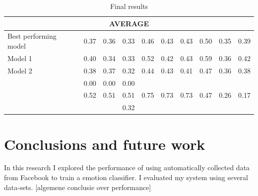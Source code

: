 \documentclass[
10pt, %
a4paper, %
oneside, %
headinclude,footinclude, %
BCOR5mm, %
]{scrartcl}
\begin{document}
\begin{table}[!htbp]
\begin{tabular}{|l|l|l|l|l|l|l|l|l|l|}
\hline
    \multicolumn{10}{|c|}{{AVERAGE}} \\                               
    
\hline
  \tiny{Best performing model} & 
  \footnotesize{0.37} & 
  \footnotesize{0.36} & 
  \footnotesize{0.33} & 
  \footnotesize{0.46} & 
  \footnotesize{0.43} & 
  \footnotesize{0.43} & 
  \footnotesize{0.50} & 
  \footnotesize{0.35} & 
  \footnotesize{0.39} \\ 

\hline
    \tiny{Model 1} & 
    \footnotesize{0.40} & 
    \footnotesize{0.34} & 
    \footnotesize{0.33} & 
    \footnotesize{0.52} & 
    \footnotesize{0.42} & 
    \footnotesize{0.43} & 
    \footnotesize{0.59} & 
    \footnotesize{0.36} & 
    \footnotesize{0.42} \\ 

\hline
    \tiny{Model 2} & 
    \footnotesize{0.38} & 
    \footnotesize{0.37} & 
    \footnotesize{0.32} & 
    \footnotesize{0.44} & 
    \footnotesize{0.43} & 
    \footnotesize{0.41} & 
    \footnotesize{0.47} & 
    \footnotesize{0.36} & 
    \footnotesize{0.38} \\ 

\hline
    \tiny{\citep{strapparava2008learning} } &
    \footnotesize{0.00} & 
    \footnotesize{0.00} & 
    \footnotesize{0.00} &
    &
    &
    &
    &
    &
    \\

\hline
    \tiny{\citep{kim2010evaluation} } &
    \footnotesize{0.52} & 
    \footnotesize{0.51} & 
    \footnotesize{0.51} &
    \footnotesize{0.75} & 
    \footnotesize{0.73} & 
    \footnotesize{0.73} &
    \footnotesize{0.47} & 
    \footnotesize{0.26} & 
    \footnotesize{0.17} \\
    
\hline
    \tiny{\citep{danisman2008feeler} } &
    \footnotesize{} & 
    \footnotesize{} & 
    \footnotesize{0.32} &
    \footnotesize{} & 
    \footnotesize{} & 
    \footnotesize{} &
    \footnotesize{} & 
    \footnotesize{} & 
    \footnotesize{} \\
\hline

\end{tabular}
\caption{Final results}
\label{final_results}
\end{table}


\newpage
\section{Conclusions and future work}
In this research I explored the performance of using automatically collected data from Facebook to train a emotion classifier. I evaluated my system using several data-sets. [algemene conclusie over performance]
\end{document}
